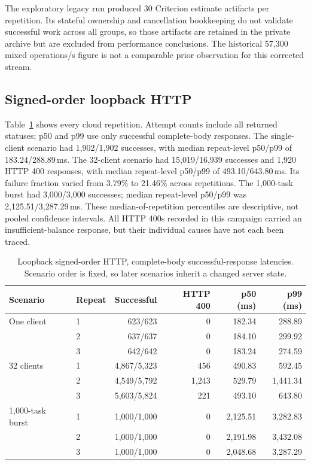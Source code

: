 \documentclass[envcountsame,runningheads,notitlepage]{llncs}
\newcommand{\pathref}[1]{\texttt{\detokenize{#1}}}
\begin{document}
The exploratory legacy \pathref{matching} run produced 30 Criterion estimate artifacts per repetition. Its stateful ownership and cancellation bookkeeping do not validate successful work across all groups, so those artifacts are retained in the private archive but are excluded from performance conclusions. The historical 57,300 mixed operations/s figure is not a comparable prior observation for this corrected stream.

\subsection{Signed-order loopback HTTP}
Table~\ref{tab:http-results} shows every cloud repetition. Attempt counts include all returned statuses; p50 and p99 use only successful complete-body responses. The single-client scenario had 1,902/1,902 successes, with median repeat-level p50/p99 of 183.24/288.89\,ms. The 32-client scenario had 15,019/16,939 successes and 1,920 HTTP 400 responses, with median repeat-level p50/p99 of 493.10/643.80\,ms. Its failure fraction varied from 3.79\% to 21.46\% across repetitions. The 1,000-task burst had 3,000/3,000 successes; median repeat-level p50/p99 was 2,125.51/3,287.29\,ms. These median-of-repetition percentiles are descriptive, not pooled confidence intervals. All HTTP 400s recorded in this campaign carried an insufficient-balance response, but their individual causes have not each been traced.\cite{benchdata}

\begin{table}[h]
\centering\small
\begin{tabular*}{\linewidth}{@{\extracolsep{\fill}}llrrrr}
\toprule
Scenario & Repeat & Successful & HTTP 400 & p50 (ms) & p99 (ms) \\
\midrule
One client & 1 & 623/623 & 0 & 182.34 & 288.89 \\
 & 2 & 637/637 & 0 & 184.10 & 299.92 \\
 & 3 & 642/642 & 0 & 183.24 & 274.59 \\
32 clients & 1 & 4,867/5,323 & 456 & 490.83 & 592.45 \\
 & 2 & 4,549/5,792 & 1,243 & 529.79 & 1,441.34 \\
 & 3 & 5,603/5,824 & 221 & 493.10 & 643.80 \\
1,000-task burst & 1 & 1,000/1,000 & 0 & 2,125.51 & 3,282.83 \\
 & 2 & 1,000/1,000 & 0 & 2,191.98 & 3,432.08 \\
 & 3 & 1,000/1,000 & 0 & 2,048.68 & 3,287.29 \\
\bottomrule
\end{tabular*}
\caption{Loopback signed-order HTTP, complete-body successful-response latencies. Scenario order is fixed, so later scenarios inherit a changed server state.}\label{tab:http-results}
\end{table}
\end{document}
